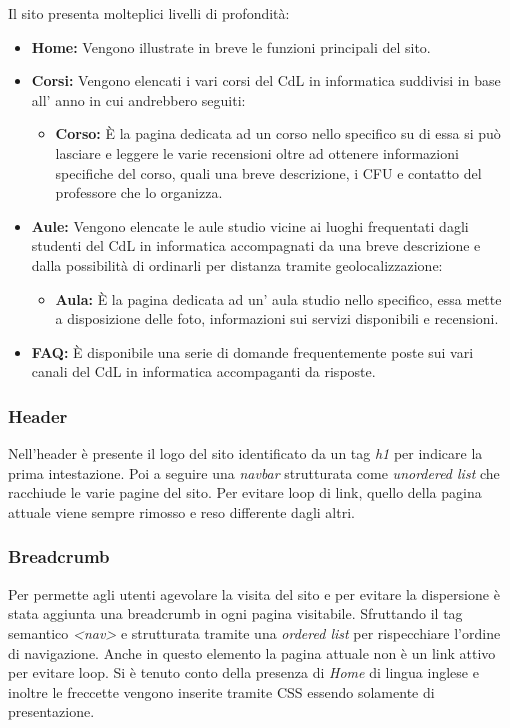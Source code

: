 Il sito presenta molteplici livelli di profondità:
\begin{itemize}
    \item \textbf{Home: } Vengono illustrate in breve le funzioni principali del sito.
    \item \textbf{Corsi: } Vengono elencati i vari corsi del CdL in informatica suddivisi in base all' anno in cui andrebbero seguiti:
        \begin{itemize}
            \item \textbf{Corso: } È la pagina dedicata ad un corso nello specifico su di essa si può lasciare e leggere le varie recensioni oltre ad ottenere informazioni specifiche del corso, quali una breve descrizione, i CFU e contatto del professore che lo organizza.
        \end{itemize}
    \item \textbf{Aule: } Vengono elencate le aule studio vicine ai luoghi frequentati dagli studenti del CdL in informatica accompagnati da una breve descrizione e dalla possibilità di ordinarli per distanza tramite geolocalizzazione:
        \begin{itemize}
            \item \textbf{Aula: } È la pagina dedicata ad un' aula studio nello specifico, essa mette a disposizione delle foto, informazioni sui servizi disponibili e recensioni.
        \end{itemize}
    \item \textbf{FAQ: } È disponibile una serie di domande frequentemente poste sui vari canali del CdL in informatica accompaganti da risposte.
\end{itemize}

\subsubsection{Header}
Nell'header è presente il logo del sito identificato da un tag \textit{h1} per indicare la prima intestazione. Poi a seguire una \textit{navbar} strutturata come \textit{unordered list} che racchiude le varie pagine del sito. Per evitare loop di link, quello della pagina attuale viene sempre rimosso e reso differente dagli altri.

\subsubsection{Breadcrumb}
Per permette agli utenti agevolare la visita del sito e per evitare la dispersione è stata aggiunta una breadcrumb in ogni pagina visitabile. Sfruttando il tag semantico \textit{<nav>} e strutturata tramite una \textit{ordered list} per rispecchiare l'ordine di navigazione. Anche in questo elemento la pagina attuale non è un link attivo per evitare loop. Si è tenuto conto della presenza di \textit{Home} di lingua inglese e inoltre le freccette vengono inserite tramite CSS essendo solamente di presentazione.

